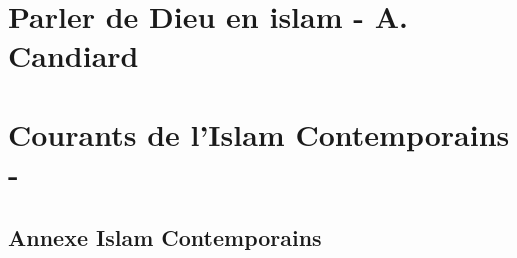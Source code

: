 \documentclass[oneside,10pt]{book} %
\begin{document}
%
%
\part{Parler de Dieu en islam - A. Candiard}
 
 
 
  
  
  
  
 




\part{Courants de l'Islam Contemporains - }


%















 






\chapter{Annexe Islam Contemporains}




\backmatter


%

\listoftheorems[ignoreall,show={Def}]

\end{document}
